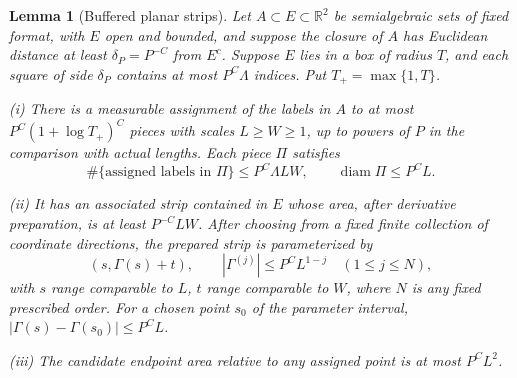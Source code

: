\documentclass[11pt]{amsart}
\newtheorem{lemma}[theorem]{Lemma}
\theoremstyle{definition}
\theoremstyle{remark}
\numberwithin{equation}{section}
\begin{document}
\begin{lemma}[Buffered planar strips]\label{geo:planar-strips}
Let $A\subset E\subset\mathbb R^2$ be semialgebraic sets of fixed format, with $E$ open and bounded, and suppose the closure of $A$ has Euclidean distance at least $\delta_P=P^{-C}$ from $E^c$. Suppose $E$ lies in a box of radius $T$, and each square of side $\delta_P$ contains at most $P^C\Lambda$ indices. Put $T_+=\max\{1,T\}$.

\noindent\textup{(i)} There is a measurable assignment of the labels in $A$ to at most $P^C(1+\log T_+)^C$ pieces with scales $L\ge W\ge1$, up to powers of $P$ in the comparison with actual lengths. Each piece $\Pi$ satisfies
\[
\#\{\text{assigned labels in }\Pi\}\le P^C\Lambda LW,\qquad \operatorname{diam}\Pi\le P^CL.
\]

\noindent\textup{(ii)} It has an associated strip contained in $E$ whose area, after derivative preparation, is at least $P^{-C}LW$. After choosing from a fixed finite collection of coordinate directions, the prepared strip is parameterized by
\[
(s,\Gamma(s)+t),\qquad |\Gamma^{(j)}|\le P^CL^{1-j}\quad(1\le j\le N),
\]
with $s$ range comparable to $L$, $t$ range comparable to $W$, where $N$ is any fixed prescribed order. For a chosen point $s_0$ of the parameter interval, $|\Gamma(s)-\Gamma(s_0)|\le P^CL$.

\noindent\textup{(iii)} The candidate endpoint area relative to any assigned point is at most $P^CL^2$.
\end{lemma}
\end{document}
